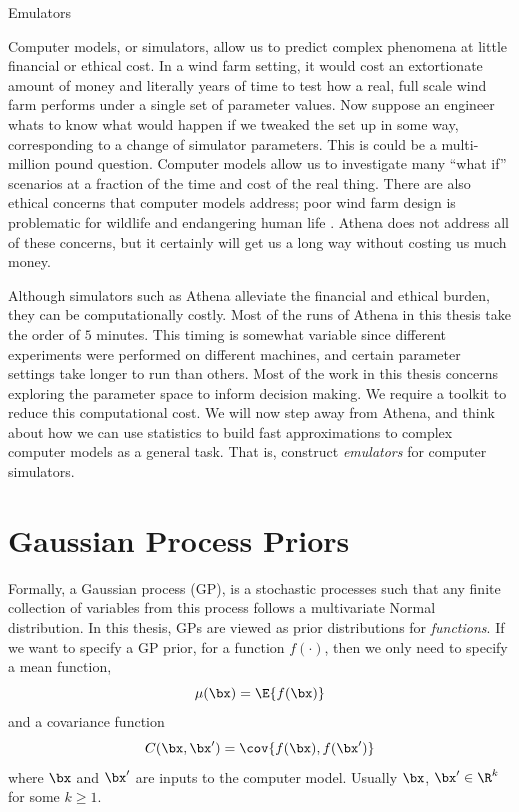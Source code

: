 \begin{chapter}{Emulators \label{Ch:Emulators}}

Computer models, or simulators, allow us to predict complex phenomena at little financial or ethical cost. In a wind farm setting, it would cost an extortionate amount of money and literally years of time to test how a real, full scale wind farm performs under a single set of parameter values. Now suppose an engineer whats to know what would happen if we tweaked the set up in some way, corresponding to a change of simulator parameters. This is could be a multi-million pound question. Computer models allow us to investigate many ``what if'' scenarios at a fraction of the time and cost of the real thing. There are also ethical concerns that computer models address; poor wind farm design is problematic for wildlife and endangering human life \citep{Bailey2014, Pedersen2020}. Athena does not address all of these concerns, but it certainly will get us a long way without costing us much money.

Although simulators such as Athena alleviate the financial and ethical burden, they can be computationally costly. Most of the runs of Athena in this thesis take the order of $5$ minutes. This timing is somewhat variable since different experiments were performed on different machines, and certain parameter settings take longer to run than others. Most of the work in this thesis concerns exploring the parameter space to inform decision making. We require a toolkit to reduce this computational cost. We will now step away from Athena, and think about how we can use statistics to build fast approximations to complex computer models as a general task. That is, construct \textit{emulators} for computer simulators.

\section{Gaussian Process Priors}

Formally, a Gaussian process (GP), is a stochastic processes such that any finite collection of variables from this process follows a multivariate Normal distribution. In this thesis, GPs are viewed as prior distributions for \textit{functions}. If we want to specify a GP prior, for a function $f(\cdot)$, then we only need to specify a mean function,
\begin{equation}
  \mu(\bx) = \E \{ f(\bx) \}
\end{equation} and a covariance function
 \begin{equation}
   C(\bx, \bx') = \cov\{ f(\bx), f(\bx')\}
 \end{equation}
where $\bx$ and $\bx'$ are inputs to the computer model. Usually $\bx$, $\bx' \in \R^k$ for some $k \geq 1$.


\end{chapter}
